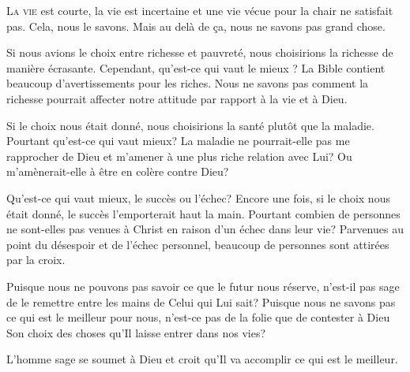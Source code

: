 \dvrule






\lettrine{L}{a vie} est courte, la vie est incertaine et une vie vécue
 pour la chair ne satisfait pas. Cela, nous le savons.
 Mais au delà de \c{c}a, nous ne savons pas grand chose. 

Si nous avions le choix entre richesse et pauvreté,
 nous choisirions la richesse de manière écrasante.
 Cependant, 
 qu'est-ce qui vaut le mieux ? 
 La Bible contient beaucoup d'avertissements pour les riches.
 Nous ne savons pas comment la richesse pourrait affecter
 notre attitude par rapport à la vie et à Dieu. 


Si le choix nous était donné, nous choisirions la santé
 plutôt que la maladie. Pourtant qu'est-ce qui vaut mieux?
 La maladie ne pourrait-elle pas me rapprocher de Dieu
 et m'amener à une plus riche relation avec Lui?
 Ou m'amènerait-elle à être en colère contre Dieu? 

Qu'est-ce qui vaut mieux, le succès ou l'échec?
 Encore une fois, si le choix nous était donné,
 le succès l'emporterait haut la main.
 Pourtant combien de personnes ne sont-elles pas venues à Christ
 en raison d'un échec dans leur vie?
 Parvenues au point du désespoir et de l'échec personnel,
 beaucoup de personnes sont attirées par la croix. 

Puisque nous ne pouvons pas savoir ce que le futur nous réserve,
 n'est-il pas sage de le remettre entre les mains de Celui qui Lui sait?
 Puisque nous ne savons pas ce qui est le meilleur pour nous,
 n'est-ce pas de la folie que de contester à Dieu Son choix des choses
 qu'Il laisse entrer dans nos vies? 

L'homme sage se soumet à Dieu et croit qu'Il va accomplir
 ce qui est le meilleur. 

